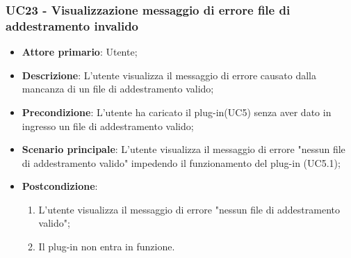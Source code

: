 \subsubsection{UC23 - Visualizzazione messaggio di errore file di addestramento invalido}
\label{sssec:uc18}
\begin{itemize}
  \item \textbf{Attore primario}: Utente;
  \item \textbf{Descrizione}: L'utente visualizza il messaggio di errore causato dalla mancanza di un file di addestramento valido;
  \item \textbf{Precondizione}: L'utente ha caricato il plug-in(UC5) senza aver dato in ingresso un file di addestramento valido;
  \item \textbf{Scenario principale}: L'utente visualizza il messaggio di errore "nessun file di addestramento valido" impedendo il funzionamento del plug-in (UC5.1);
  \item \textbf{Postcondizione}:
  \begin{enumerate}
		\item L'utente visualizza il messaggio di errore "nessun file di addestramento valido";
		\item Il plug-in non entra in funzione.
	\end{enumerate}
\end{itemize}
